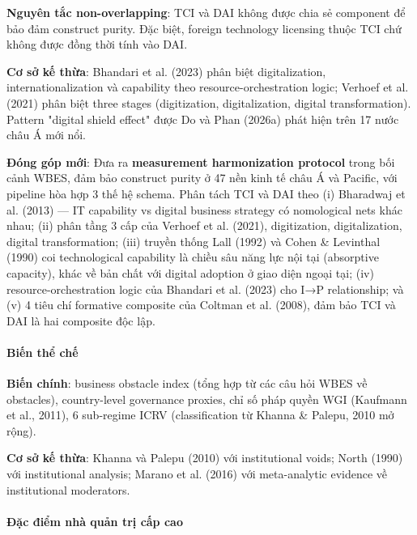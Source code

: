 \documentclass[12pt,a4paper]{article}
\begin{document}
\textbf{Nguyên tắc non-overlapping}: TCI và DAI không được chia sẻ
component để bảo đảm construct purity. Đặc biệt, foreign technology
licensing thuộc TCI chứ không được đồng thời tính vào DAI.

\textbf{Cơ sở kế thừa}: Bhandari et al. (2023) phân biệt digitalization,
internationalization và capability theo resource-orchestration logic;
Verhoef et al. (2021) phân biệt three stages (digitization,
digitalization, digital transformation). Pattern "digital shield effect"
được Do và Phan (2026a) phát hiện trên 17 nước châu Á mới nổi.

\textbf{Đóng góp mới}: Đưa ra \textbf{measurement harmonization
protocol} trong bối cảnh WBES, đảm bảo construct purity ở 47 nền kinh tế
châu Á và Pacific, với pipeline hòa hợp 3 thế hệ schema. Phân tách TCI
và DAI theo (i) Bharadwaj et al. (2013) --- IT capability vs digital
business strategy có nomological nets khác nhau; (ii) phân tầng 3 cấp
của Verhoef et al. (2021), digitization, digitalization, digital
transformation; (iii) truyền thống Lall (1992) và Cohen \& Levinthal
(1990) coi technological capability là chiều sâu năng lực nội tại
(absorptive capacity), khác về bản chất với digital adoption ở giao diện
ngoại tại; (iv) resource-orchestration logic của Bhandari et al. (2023)
cho I→P relationship; và (v) 4 tiêu chí formative composite của Coltman
et al. (2008), đảm bảo TCI và DAI là hai composite độc lập.

\hypertarget{biux1ebfn-thux1ec3-chux1ebf}{%
\paragraph{Biến thể chế}\label{biux1ebfn-thux1ec3-chux1ebf}}

\textbf{Biến chính}: business obstacle index (tổng hợp từ các câu hỏi
WBES về obstacles), country-level governance proxies, chỉ số pháp quyền
WGI (Kaufmann et al., 2011), 6 sub-regime ICRV (classification từ Khanna
\& Palepu, 2010 mở rộng).

\textbf{Cơ sở kế thừa}: Khanna và Palepu (2010) với institutional voids;
North (1990) với institutional analysis; Marano et al. (2016) với
meta-analytic evidence về institutional moderators.

\hypertarget{ux111ux1eb7c-ux111iux1ec3m-nhuxe0-quux1ea3n-trux1ecb-cux1ea5p-cao}{%
\paragraph{Đặc điểm nhà quản trị cấp
cao}\label{ux111ux1eb7c-ux111iux1ec3m-nhuxe0-quux1ea3n-trux1ecb-cux1ea5p-cao}}
\end{document}

